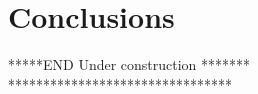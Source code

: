 \documentclass[final,5p,times]{elsarticle}
\begin{document}
\section{Conclusions}

*****END Under construction *******\\
********************************













\end{document}

